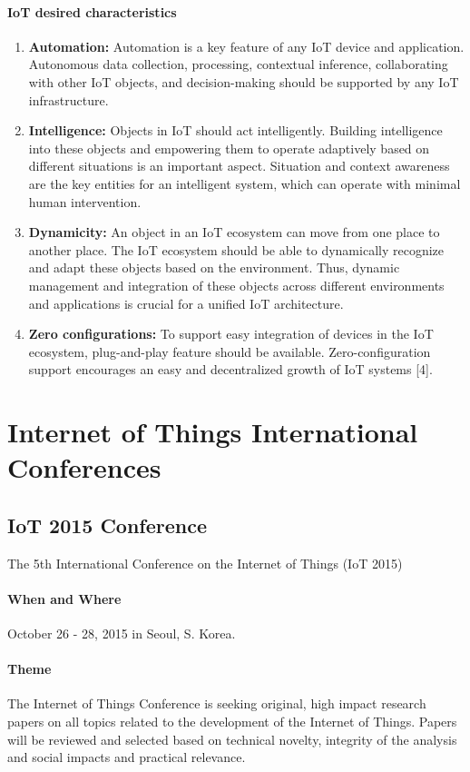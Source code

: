 \documentclass[12pt]{article}
\begin{document}
\paragraph {IoT desired characteristics}
\begin{enumerate}
\item \textbf {Automation:} Automation is a key feature of any IoT
device and application. Autonomous data collection, processing,
contextual inference, collaborating with other
IoT objects, and decision-making should be supported by
any IoT infrastructure.
\item \textbf {Intelligence:} Objects in IoT should act intelligently.
Building intelligence into these objects and empowering
them to operate adaptively based on different situations
is an important aspect. Situation and context awareness
are the key entities for an intelligent system, which can
operate with minimal human intervention.
\item \textbf {Dynamicity:} An object in an IoT ecosystem can move
from one place to another place. The IoT ecosystem
should be able to dynamically recognize and adapt these
objects based on the environment. Thus, dynamic management
and integration of these objects across different
environments and applications is crucial for a unified IoT
architecture.
\item \textbf {Zero configurations:} To support easy integration of
devices in the IoT ecosystem, plug-and-play feature
should be available. Zero-configuration support encourages
an easy and decentralized growth of IoT systems [4].
\end{enumerate}

\section{Internet of Things International Conferences}

\subsection {IoT 2015 Conference}
The 5th International Conference on the Internet of Things (IoT 2015) 

\paragraph{When and Where} October 26 - 28, 2015 in Seoul, S. Korea.

 \paragraph{Theme}The Internet of Things Conference is seeking original, high impact research papers on all topics related to the development of the Internet of Things. Papers will be reviewed and selected based on technical novelty, integrity of the analysis and social impacts and practical relevance.
\end{document}
